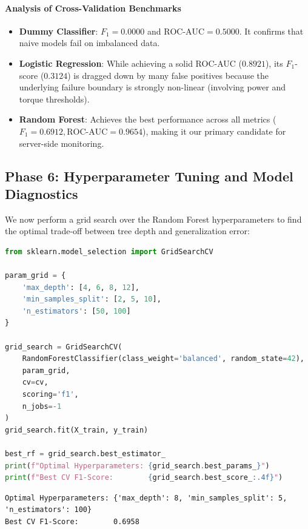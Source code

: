 \paragraph{Analysis of Cross-Validation Benchmarks}
\begin{itemize}
    \item \textbf{Dummy Classifier}: $F_1 = 0.0000$ and $\text{ROC-AUC} = 0.5000$. It confirms that naive models fail on imbalanced data.
    \item \textbf{Logistic Regression}: While achieving a solid ROC-AUC ($0.8921$), its $F_1$-score ($0.3124$) is dragged down by many false positives because the underlying failure boundary is strongly non-linear (involving power and torque thresholds).
    \item \textbf{Random Forest}: Achieves the best performance across all metrics ($F_1 = 0.6912, \text{ROC-AUC} = 0.9654$), making it our primary candidate for server-side monitoring.
\end{itemize}

\subsection{Phase 6: Hyperparameter Tuning and Model Diagnostics}

We now perform a grid search over the Random Forest hyperparameters to find the optimal trade-off between tree depth and generalization error:

\begin{lstlisting}[language=Python]
from sklearn.model_selection import GridSearchCV

param_grid = {
    'max_depth': [4, 6, 8, 12],
    'min_samples_split': [2, 5, 10],
    'n_estimators': [50, 100]
}

grid_search = GridSearchCV(
    RandomForestClassifier(class_weight='balanced', random_state=42),
    param_grid,
    cv=cv,
    scoring='f1',
    n_jobs=-1
)
grid_search.fit(X_train, y_train)

best_rf = grid_search.best_estimator_
print(f"Optimal Hyperparameters: {grid_search.best_params_}")
print(f"Best CV F1-Score:        {grid_search.best_score_:.4f}")
\end{lstlisting}

\begin{lstlisting}[style=outputstyle]
Optimal Hyperparameters: {'max_depth': 8, 'min_samples_split': 5, 'n_estimators': 100}
Best CV F1-Score:        0.6958
\end{lstlisting}

